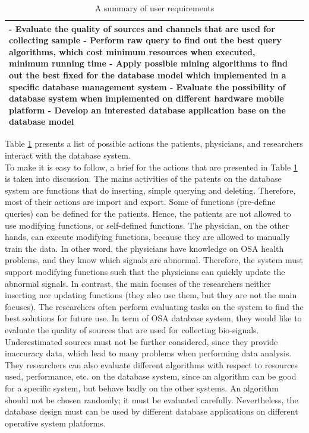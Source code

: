 \begin{table}[ht]
\begin{center}
\begin{tabular}{ |p{3cm}||p{10cm}|}
 - Evaluate the quality of sources and channels that are used for collecting sample\newline
 - Perform raw query to find out the best query algorithms, which cost minimum resources when executed, minimum running time\newline
 - Apply possible mining algorithms to find out the best fixed for the database model which implemented in a specific database management system\newline
 - Evaluate the possibility of database system when implemented on different hardware mobile platform\newline
 - Develop an interested database application base on the database model\\
 \hline
\end{tabular}
\end{center}
\caption{A summary of user requirements}
\label{tab:userrequirementDB}
\end{table}
Table \ref{tab:userrequirementDB} presents a list of possible actions the patients, physicians, and researchers interact with the database system.\\
To make it is easy to follow, a brief for the actions that are presented in Table \ref{tab:userrequirementDB} is taken into discussion. The mains activities of the patents on the database system are functions that do inserting, simple querying and deleting. Therefore, most of their actions are import and export. Some of functions (pre-define queries) can be defined for the patients. Hence, the patients are not allowed to use modifying functions, or self-defined functions. The physician, on the other hands, can execute modifying functions, because they are allowed to manually train the data. In other word, the physicians have knowledge on OSA health problems, and they know which signals are abnormal. Therefore, the system must support modifying functions such that the physicians can quickly update the abnormal signals. In contrast, the main focuses of the researchers neither inserting nor updating functions (they also use them, but they are not the main focuses). The researchers often perform evaluating tasks on the system to find the best solutions for future use. In term of OSA database system, they would like to evaluate the quality of sources that are used for collecting bio-signals. Underestimated sources must not be further considered, since they provide inaccuracy data, which lead to many problems when performing data analysis. They researchers can also evaluate different algorithms with respect to resources used, performance, etc. on the database system, since an algorithm can be good for a specific system, but behave badly on the other systems. An algorithm should not be chosen randomly; it must be evaluated carefully. Nevertheless, the database design must can be used by different database applications on different operative system platforms.
